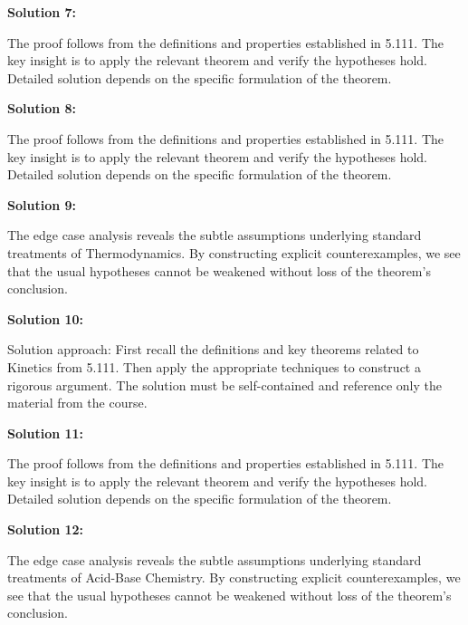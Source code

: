 \documentclass[12pt,a4paper]{exam}
\begin{document}
\vspace{0.5cm}

\textbf{Solution 7:}

The proof follows from the definitions and properties established in 5.111. The key insight is to apply the relevant theorem and verify the hypotheses hold. Detailed solution depends on the specific formulation of the theorem.

\vspace{0.5cm}

\textbf{Solution 8:}

The proof follows from the definitions and properties established in 5.111. The key insight is to apply the relevant theorem and verify the hypotheses hold. Detailed solution depends on the specific formulation of the theorem.

\vspace{0.5cm}

\textbf{Solution 9:}

The edge case analysis reveals the subtle assumptions underlying standard treatments of Thermodynamics. By constructing explicit counterexamples, we see that the usual hypotheses cannot be weakened without loss of the theorem's conclusion.

\vspace{0.5cm}

\textbf{Solution 10:}

Solution approach: First recall the definitions and key theorems related to Kinetics from 5.111. Then apply the appropriate techniques to construct a rigorous argument. The solution must be self-contained and reference only the material from the course.

\vspace{0.5cm}

\textbf{Solution 11:}

The proof follows from the definitions and properties established in 5.111. The key insight is to apply the relevant theorem and verify the hypotheses hold. Detailed solution depends on the specific formulation of the theorem.

\vspace{0.5cm}

\textbf{Solution 12:}

The edge case analysis reveals the subtle assumptions underlying standard treatments of Acid-Base Chemistry. By constructing explicit counterexamples, we see that the usual hypotheses cannot be weakened without loss of the theorem's conclusion.
\end{document}
